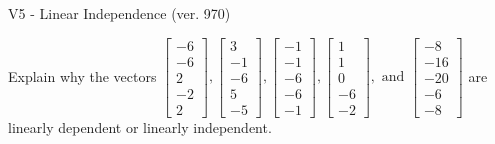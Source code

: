 \begin{exercise}
  \begin{exerciseTitle}V5 - Linear Independence (ver. 970)\end{exerciseTitle}
  \begin{exerciseStatement}
    Explain why the vectors \(\left[\begin{array}{r}
-6 \\
-6 \\
2 \\
-2 \\
2
\end{array}\right] , \left[\begin{array}{r}
3 \\
-1 \\
-6 \\
5 \\
-5
\end{array}\right] , \left[\begin{array}{r}
-1 \\
-1 \\
-6 \\
-6 \\
-1
\end{array}\right] , \left[\begin{array}{r}
1 \\
1 \\
0 \\
-6 \\
-2
\end{array}\right] , \text{ and } \left[\begin{array}{r}
-8 \\
-16 \\
-20 \\
-6 \\
-8
\end{array}\right]\) are linearly dependent or linearly independent.	



\end{exerciseStatement}
\end{exercise}
